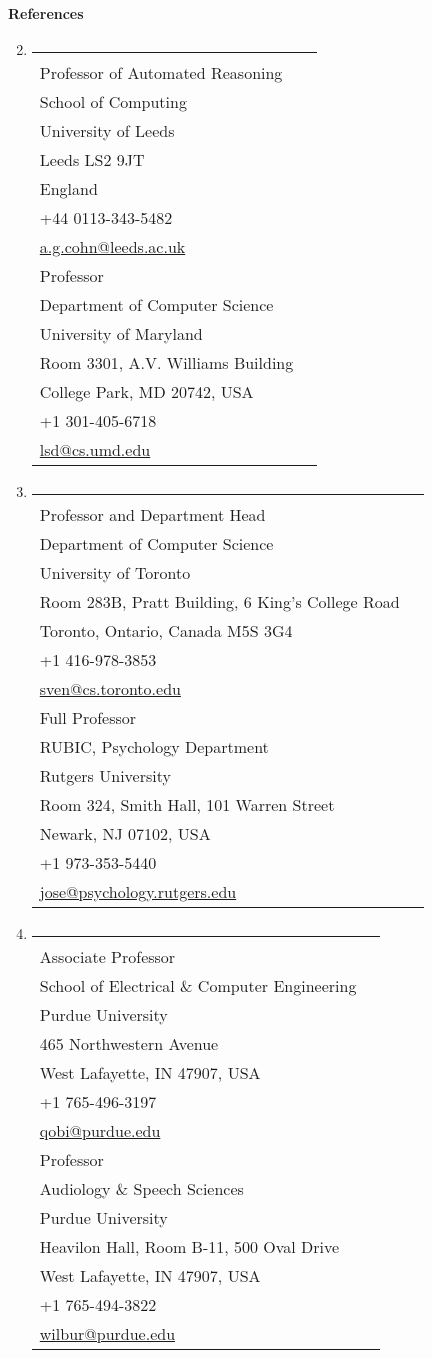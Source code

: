 \documentclass[10pt]{article}
\makeatletter
\newenvironment{benumerate}[2]{
    \let\oldItem\item
    \def\item{\addtocounter{enumi}{-2}\oldItem}
    \begin{enumerate}[#2]
    \setcounter{enumi}{#1}
    \addtocounter{enumi}{1}}
  {\end{enumerate}}
\newcommand{\reference}[8]{%
  \begin{tabular}{@{}l@{}}%
    \textbf{#1}\\%
    #2\\%
    #3\\%
    #4\\%
    #5\\%
    #6\\%
    #7\\%
    \href{mailto:#8}{#8}%
  \end{tabular}%
}
\newcommand{\refrow}[2]{%
\item \begin{tabular*}{0.9\textwidth}{@{}p{3.0in}@{\hspace*{0.3in}}p{3.0in}@{}} #1 & #2 \end{tabular*}
\vspace*{1ex}}
\newenvironment{region}[3]{%
  \vspace*{0.5ex}
  {\large \textbf{#1}}
  \begin{benumerate}{#3}{\color{RoyalBlue}#2}}
  {\end{benumerate}\vspace{1ex}}
\newenvironment{nonumregion}[1]{%
\begin{region}{#1}{}{1}}
{\end{region}}
\makeatother
\begin{document}
\begin{nonumregion}{References}
  \refrow{
    \reference{Tony Cohn}
    {Professor of Automated Reasoning}
    {School of Computing}
    {University of Leeds}
    {Leeds LS2 9JT}
    {England}
    {+44 0113-343-5482}
    {a.g.cohn@leeds.ac.uk}
  }{
    \reference{Larry Davis}
    {Professor}
    {Department of Computer Science}
    {University of Maryland}
    {Room 3301, A.V. Williams Building}
    {College Park, MD 20742, USA}
    {+1 301-405-6718}
    {lsd@cs.umd.edu}
  }
  \refrow{
    \reference{Sven Dickinson}
    {Professor and Department Head}
    {Department of Computer Science}
    {University of Toronto}
    {Room 283B, Pratt Building, 6 King's College Road}
    {Toronto, Ontario, Canada M5S 3G4}
    {+1 416-978-3853}
    {sven@cs.toronto.edu}
  }{
    \reference{Stephen Jos\'e Hanson}
    {Full Professor}
    {RUBIC, Psychology Department}
    {Rutgers University}
    {Room 324, Smith Hall, 101 Warren Street}
    {Newark, NJ 07102, USA}
    {+1 973-353-5440}
    {jose@psychology.rutgers.edu}
  }
  \refrow{
    \reference{Jeffrey Mark Siskind}
    {Associate Professor}
    {School of Electrical \& Computer Engineering}
    {Purdue University}
    {465 Northwestern Avenue}
    {West Lafayette, IN 47907, USA}
    {+1 765-496-3197}
    {qobi@purdue.edu}
  }{
    \reference{Ronnie Wilbur}
    {Professor}
    {Audiology \& Speech Sciences}
    {Purdue University}
    {Heavilon Hall, Room B-11, 500 Oval Drive}
    {West Lafayette, IN 47907, USA}
    {+1 765-494-3822}
    {wilbur@purdue.edu}
  }
\end{nonumregion}
\end{document}
